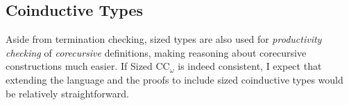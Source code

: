 \documentclass[acmsmall,nonacm, screen]{acmart}
\newcommand{\lang}{Sized CC$_\omega$\xspace}
\newcommand{\we}{I\xspace}
\begin{document}
\subsection{Coinductive Types}

Aside from termination checking, sized types are also used for
\emph{productivity checking} of \emph{corecursive} definitions,
making reasoning about corecursive constructions much easier.
If \lang is indeed consistent, \we expect that extending the language and the proofs
to include sized coinductive types would be relatively straightforward.



\end{document}
